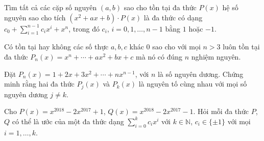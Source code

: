 \begin{bt}
Tìm tất cả các cặp số nguyên $(a,b)$ sao cho tồn tại đa thức $P(x)$ hệ số nguyên sao cho tích $\left(x^2+ax+b\right)\cdot P(x)$ là đa thức có dạng $c_0+\displaystyle\sum_{i=1}^{n-1}c_i x^i+x^n$, trong đó $c_i$, $i=0,1,\ldots, n-1$ bằng $1$ hoặc $-1$.
\end{bt}

\begin{bt}
Có tồn tại hay không các số thực $a,b,c$ khác $0$ sao cho với mọi $n>3$ luôn tồn tại đa thức $P_n(x)=x^n+\cdots+ax^2+bx+c$ mà nó có đúng $n$ nghiệm nguyên.
\end{bt}

\begin{bt}
Đặt $P_n(x)=1+2x+3x^2+\cdots+nx^{n-1}$, với $n$ là số nguyên dương. Chứng minh rằng hai đa thức $P_j(x)$ và $P_k(x)$ là nguyên tố cùng nhau với mọi số nguyên dương $j\neq k$.
\end{bt}

\begin{bt}
Cho $P(x)=x^{2018}-2x^{2017}+1$, $Q(x)=x^{2018}-2x^{2017}-1$. Hỏi mỗi đa thức $P$, $Q$ có thể là ước của một đa thức dạng $\displaystyle\sum_{i=0}^kc_ix^i$ với $k\in\mathbb{N}$, $c_i\in\{\pm 1\}$ với mọi $i=1,\ldots,k$.
\end{bt}


